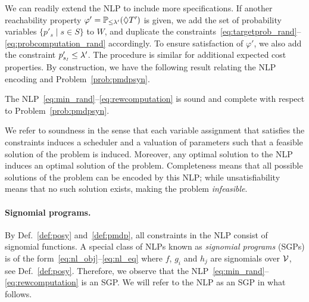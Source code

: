 We can readily extend the NLP to include more specifications. If
another reachability property $\varphi'=\mathbb{P}_{\leq \lambda'}(\lozenge T')$ is given, we add the set of probability variables $\{ p'_s \mid
s \in S\}$ to $W$, and duplicate the 
constraints~\eqref{eq:targetprob_rand}--\eqref{eq:probcomputation_rand} accordingly.
To ensure satisfaction of $\varphi'$, we also add the constraint
$p'_{s_{\mathit{I}}}\leq \lambda'$.
The procedure is similar for additional expected cost properties. 
By construction, we have the following result relating the NLP encoding and Problem~\ref{prob:pmdpsyn}.
\begin{theorem}
	\label{thm:soundcomplete}
	The NLP~\eqref{eq:min_rand}--\eqref{eq:rewcomputation} is sound and complete with respect to Problem~\ref{prob:pmdpsyn}.
\end{theorem}
%
We refer to soundness in the sense that each variable assignment that satisfies
the constraints induces a scheduler and a valuation of parameters such that a
feasible solution of the problem is induced. Moreover, any optimal solution to
the NLP induces an optimal solution of the problem. Completeness means that all
possible solutions of the problem can be encoded by this NLP; while
unsatisfiability means that no such solution exists, making the problem
\emph{infeasible}.

\paragraph{Signomial programs.} By Def.~\ref{def:posy} and~\ref{def:pmdp}, all constraints in the NLP consist of signomial functions.
A special class of NLPs known as \emph{signomial programs} (SGPs) is of the form~\eqref{eq:nl_obj}--\eqref{eq:nl_eq} where $f$, $g_i$ and $h_j$ are signomials over $\mathcal{V}$, see Def.~\ref{def:posy}. Therefore, we observe that the NLP~\eqref{eq:min_rand}--\eqref{eq:rewcomputation} is an SGP. We will refer to the NLP as an SGP in what follows.

